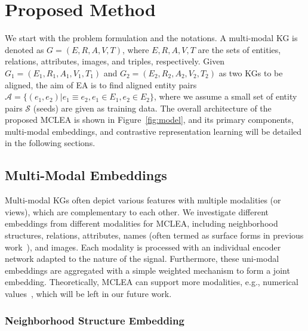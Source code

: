 \documentclass[11pt]{article}
\begin{document}
\section{Proposed Method}





We start with the problem formulation and the notations.
A multi-modal KG is denoted as $G=(E,R,A,V,T)$, where $E,R,A,V,T$ are the sets of entities, relations, attributes, images, and triples, respectively. 
Given $G_1=(E_1,R_1,A_1,V_1,T_1)$ and $G_2=(E_2,R_2,A_2,V_2,T_2)$ as two KGs to be aligned, the aim of EA is to find aligned entity pairs $\mathcal{A}=\{(e_1,e_2)|e_1\equiv e_2,e_1\in {E_1}, e_2\in {E_2}\}$, where we assume a small set of entity pairs $\mathcal{S}$ (seeds) are given as training data.
The overall architecture of the proposed MCLEA is shown in Figure~\ref{fig:model}, and its primary components, multi-modal embeddings, and contrastive representation learning will be detailed in the following sections.



\subsection{Multi-Modal Embeddings}
\label{sec:embedding}

Multi-modal KGs often depict various features with multiple modalities (or views), which are complementary to each other. 
We investigate different embeddings from different modalities for MCLEA, including neighborhood structures, relations, attributes, names (often termed as surface forms in previous work~\cite{liu2021visual}), and images.
Each modality is processed with an individual encoder network adapted to the nature of the signal. 
Furthermore, these uni-modal embeddings are aggregated with a simple weighted mechanism to form a joint embedding.
Theoretically, MCLEA can support more modalities, e.g., numerical values~\cite{chen2020mmea}, which will be left in our future work.

\subsubsection{Neighborhood Structure Embedding}
\end{document}
